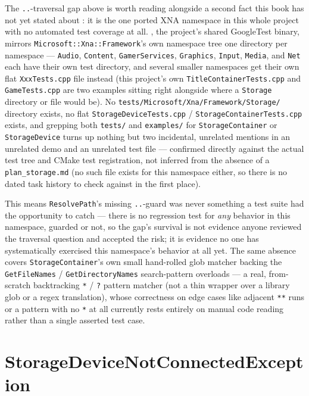 The \texttt{..}-traversal gap above is worth reading alongside a second fact this book has not
yet stated about : it is the one ported XNA namespace in this whole project
with no automated test coverage at all. , the project's shared GoogleTest
binary, mirrors \texttt{Microsoft::Xna::Framework}'s own namespace tree one directory per
namespace --- \texttt{Audio}, \texttt{Content}, \texttt{GamerServices}, \texttt{Graphics},
\texttt{Input}, \texttt{Media}, and \texttt{Net} each have their own test directory, and
several smaller namespaces get their own flat \texttt{XxxTests.cpp} file instead (this
project's own \texttt{TitleContainerTests.cpp} and \texttt{GameTests.cpp} are two examples
sitting right alongside where a \texttt{Storage} directory or file would be). No
\texttt{tests/Microsoft/Xna/Framework/Storage/} directory exists, no flat
\texttt{StorageDeviceTests.cpp} / \texttt{StorageContainerTests.cpp} exists, and grepping both
\texttt{tests/} and \texttt{examples/} for \texttt{StorageContainer} or \texttt{StorageDevice}
turns up nothing but two incidental, unrelated mentions in an unrelated demo and an unrelated
 test file --- confirmed directly against the actual test tree and CMake
test registration, not inferred from the absence of a \texttt{plan\_storage.md} (no such file
exists for this namespace either, so there is no dated task history to check against in the
first place).

This means \texttt{ResolvePath}'s missing \texttt{..}-guard was never something a test suite
had the opportunity to catch --- there is no regression test for \emph{any} behavior in this
namespace, guarded or not, so the gap's survival is not evidence anyone reviewed the traversal
question and accepted the risk; it is evidence no one has systematically exercised this
namespace's behavior at all yet. The same absence covers \texttt{StorageContainer}'s own small
hand-rolled glob matcher backing the \texttt{GetFileNames} / \texttt{GetDirectoryNames} search-pattern
overloads --- a real, from-scratch backtracking \texttt{*} / \texttt{?} pattern matcher (not a
thin wrapper over a library glob or a regex translation), whose correctness on edge cases like
adjacent \texttt{**} runs or a pattern with no \texttt{*} at all currently rests entirely on
manual code reading rather than a single asserted test case.

\section{StorageDeviceNotConnectedException}


